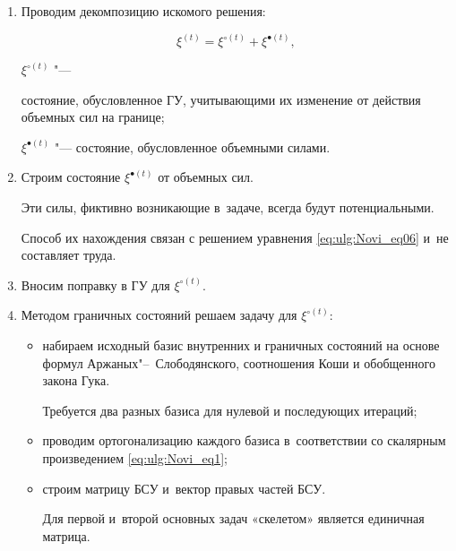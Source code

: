 \begin{enumerate}





\item[1.] Проводим декомпозицию искомого решения: 

$$

\xi ^{(t)} =\xi ^{\circ (t)} +\xi ^{\bullet (t)} ,$$ 

$\xi ^{\circ (t)} $ "---

состояние, обусловленное ГУ, учитывающими их изменение от действия объемных сил на границе; 

$\xi ^{\bullet (t)} $ "--- состояние, обусловленное объемными силами. 



\item[2.] Строим состояние $\xi ^{\bullet (t)} $ от объемных сил. 

Эти силы, фиктивно возникающие в~задаче, всегда будут потенциальными. 

Способ их нахождения связан с решением уравнения \eqref{eq:ulg:Novi_eq06} и~не составляет труда. 



\item[3.] Вносим поправку в ГУ для $\xi ^{\circ (t)} $.



\item[4.] Методом граничных состояний решаем задачу для $\xi ^{\circ (t)} $: 



\begin{itemize}





\item[а)] набираем исходный базис внутренних и граничных состояний на основе формул Аржаных"--~Слободянского, соотношения Коши и обобщенного закона Гука. 

Требуется два разных базиса для нулевой и последующих итераций; 



\item[б)] проводим ортогонализацию каждого базиса \cite{Novi_bib8} в~соответствии со скалярным произведением \eqref{eq:ulg:Novi_eq1};



\item[в)] строим матрицу БСУ и~вектор правых частей БСУ. 

Для первой и~второй основных задач «скелетом» является единичная матрица. 


\end{itemize}
\end{enumerate}
